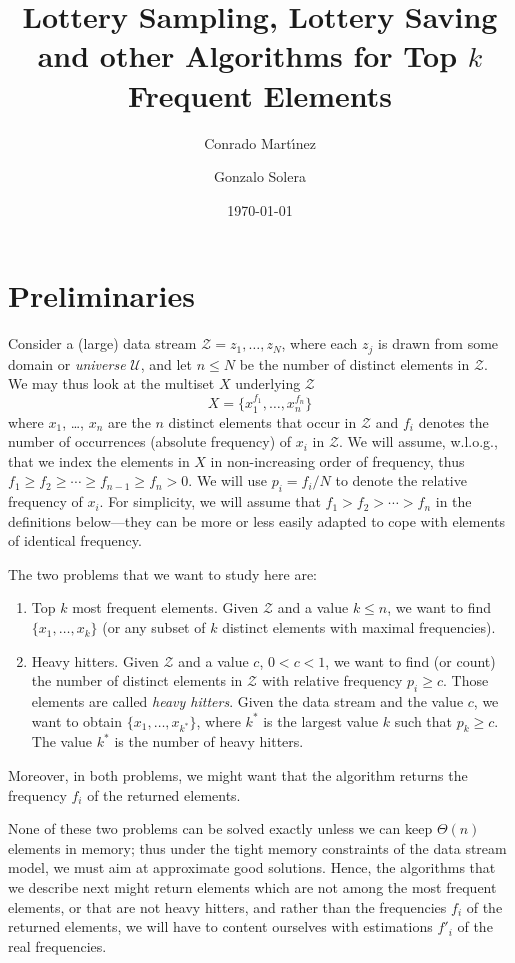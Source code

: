 \documentclass{article}
\title{Lottery Sampling, Lottery Saving and other Algorithms
  for Top $k$ Frequent Elements}
\author{Conrado Mart{\'\i}nez \and Gonzalo Solera} %
\date{\today}
\begin{document}
\maketitle

\section{Preliminaries}
Consider a (large) data stream $\mathcal{Z}=z_1,\ldots,z_N$, where each $z_j$ is
drawn from some domain or \emph{universe} $\mathcal{U}$, and let $n\le N$ 
be the number of distinct elements in $\mathcal{Z}$. We may thus look at 
the multiset $X$ underlying $\mathcal{Z}$
\[
X = \{x_1^{f_1},\ldots,x_n^{f_n}\}
\]
where $x_1$, \ldots, $x_n$ are the $n$ distinct elements that occur 
in $\mathcal{Z}$ and $f_i$ denotes the number of occurrences (absolute 
frequency) of $x_i$ in $\mathcal{Z}$.
We will assume, w.l.o.g., 
that we index the elements in $X$ in non-increasing order
of frequency, thus $f_1\ge f_2 \ge \cdots \ge f_{n-1} \ge f_n > 0$.
We will use $p_i = f_i/N$ to denote the relative frequency of $x_i$.
For simplicity, we will assume that $f_1 > f_2 > \cdots > f_n$ in the
definitions below---they can be more or less easily adapted to cope
with elements
of identical frequency.

The two problems that we want to study here are:
\begin{enumerate}
\item Top $k$ most frequent elements. Given $\mathcal{Z}$ and a value
$k\le n$, we want to find 
$\{x_1,\ldots,x_k\}$ (or any subset of $k$ distinct elements
  with maximal frequencies). 
\item Heavy hitters. Given $\mathcal{Z}$ and a value $c$, $0 < c < 1$, 
we want to find (or count) the number
of distinct elements in $\mathcal{Z}$ with relative frequency $p_i \ge c$.
Those elements are called \emph{heavy hitters}. 
Given the data stream and the value $c$, we want to obtain
$\{x_1,\ldots,x_{k^\ast}\}$, where $k^\ast$ is
the largest value $k$ such that $p_k \ge c$. The value $k^\ast$
is the number of heavy hitters. 
\end{enumerate}
Moreover, in both problems, we might want that the algorithm
  returns the frequency $f_i$ of the returned elements. 

  None of these two problems can be solved exactly unless we can keep
  $\Theta(n)$ elements in memory; thus under the tight memory
  constraints of the data stream model, we must aim at approximate
  good solutions. Hence, the algorithms that we describe next might
  return elements which are not among the most frequent elements, or
  that are not heavy hitters, and rather than the frequencies $f_i$ of
  the returned elements, we will have to content ourselves with
  estimations $f'_i$ of the real frequencies.
\end{document}
